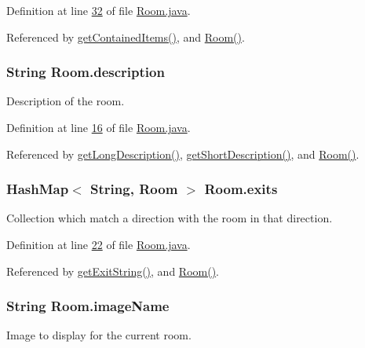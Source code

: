 Definition at line \hyperlink{Room_8java_source_l00032}{32} of file \hyperlink{Room_8java_source}{Room.\-java}.



Referenced by \hyperlink{Room_8java_source_l00075}{get\-Contained\-Items()}, and \hyperlink{Room_8java_source_l00049}{Room()}.

\hypertarget{classRoom_a2d7ecf802690a6b13750ca6fa6882d77}{
\subsubsection[{description}]{\setlength{\rightskip}{0pt plus 5cm}String Room.\-description\hspace{0.3cm}{\ttfamily [private]}}}\label{classRoom_a2d7ecf802690a6b13750ca6fa6882d77}
Description of the room. 

Definition at line \hyperlink{Room_8java_source_l00016}{16} of file \hyperlink{Room_8java_source}{Room.\-java}.



Referenced by \hyperlink{Room_8java_source_l00100}{get\-Long\-Description()}, \hyperlink{Room_8java_source_l00091}{get\-Short\-Description()}, and \hyperlink{Room_8java_source_l00039}{Room()}.

\hypertarget{classRoom_ae2a85f60f11d82f6222a926b1a22d05d}{
\subsubsection[{exits}]{\setlength{\rightskip}{0pt plus 5cm}Hash\-Map$<$ String, {\bf Room} $>$ Room.\-exits\hspace{0.3cm}{\ttfamily [private]}}}\label{classRoom_ae2a85f60f11d82f6222a926b1a22d05d}
Collection which match a direction with the room in that direction. 

Definition at line \hyperlink{Room_8java_source_l00022}{22} of file \hyperlink{Room_8java_source}{Room.\-java}.



Referenced by \hyperlink{Room_8java_source_l00137}{get\-Exit\-String()}, and \hyperlink{Room_8java_source_l00049}{Room()}.

\hypertarget{classRoom_a3ddf7c120b54509c43d803d2409158fc}{
\subsubsection[{image\-Name}]{\setlength{\rightskip}{0pt plus 5cm}String Room.\-image\-Name\hspace{0.3cm}{\ttfamily [private]}}}\label{classRoom_a3ddf7c120b54509c43d803d2409158fc}
Image to display for the current room. 

